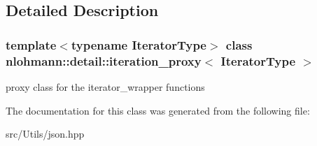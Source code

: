 \subsection{Detailed Description}
\subsubsection*{template$<$typename Iterator\+Type$>$\newline
class nlohmann\+::detail\+::iteration\+\_\+proxy$<$ Iterator\+Type $>$}

proxy class for the iterator\+\_\+wrapper functions 

The documentation for this class was generated from the following file\+:\begin{DoxyCompactItemize}
\item 
src/\+Utils/json.\+hpp\end{DoxyCompactItemize}
